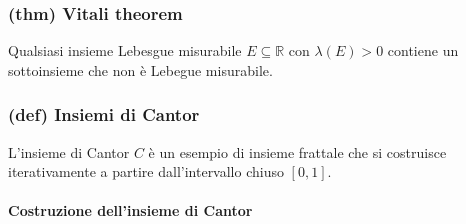 \subsubsection{(thm) Vitali theorem}
Qualsiasi insieme Lebesgue misurabile $E\subseteq \mathbb R$ con $\lambda(E)>0$ contiene un sottoinsieme che non è Lebegue misurabile.
\newpage
\subsubsection{(def) Insiemi di Cantor}

L'insieme di Cantor \( C \) è un esempio di insieme frattale che si costruisce iterativamente a partire dall'intervallo chiuso \([0, 1]\).

\paragraph{Costruzione dell'insieme di Cantor}

